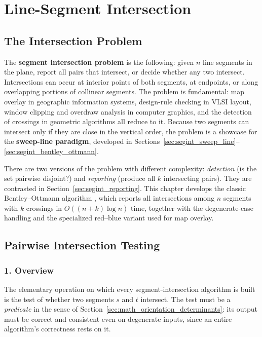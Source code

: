 \chapter{Line-Segment Intersection}
\label{ch:segment_intersection}

\section{The Intersection Problem}
\label{sec:segint_problem}

The \textbf{segment intersection problem} is the following: given $n$ line
segments in the plane, report all pairs that intersect, or decide whether
any two intersect. Intersections can occur at interior points of both
segments, at endpoints, or along overlapping portions of collinear
segments. The problem is fundamental: map overlay in geographic information
systems, design-rule checking in VLSI layout, window clipping and
overdraw analysis in computer graphics, and the detection of crossings in
geometric algorithms all reduce to it. Because two segments can intersect
only if they are close in the vertical order, the problem is a showcase for
the \textbf{sweep-line paradigm}, developed in
Sections~\ref{sec:segint_sweep_line}--\ref{sec:segint_bentley_ottmann}.

There are two versions of the problem with different complexity:
\emph{detection} (is the set pairwise disjoint?) and \emph{reporting}
(produce all $k$ intersecting pairs). They are contrasted in
Section~\ref{sec:segint_reporting}. This chapter develops the classic
Bentley--Ottmann algorithm \cite{bentley1979}, which reports all
intersections among $n$ segments with $k$ crossings in
$O((n+k)\log n)$ time, together with the degenerate-case handling and the
specialized red--blue variant used for map overlay.

\section{Pairwise Intersection Testing}
\label{sec:segint_pairwise}

\subsection{1. Overview}

The elementary operation on which every segment-intersection algorithm is
built is the test of whether two segments $s$ and $t$ intersect. The test
must be a \emph{predicate} in the sense of Section~\ref{sec:math_orientation_determinants}:
its output must be correct and consistent even on degenerate inputs, since
an entire algorithm's correctness rests on it.

